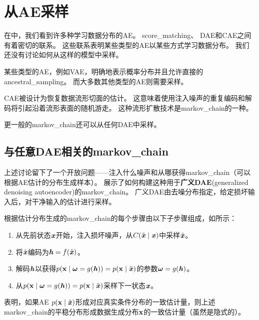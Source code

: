\section{从\gls{AE}采样}
\label{sec:drawing_samples_from_autoencoders}

在中，我们看到许多种学习数据分布的\gls{AE}。
\gls{score_matching}、 \gls{DAE}和\gls{CAE}之间有着密切的联系。
这些联系表明某些类型的\gls{AE}以某些方式学习数据分布。
我们还没有讨论如何从这样的模型中采样。

某些类型的\gls{AE}，例如\gls{VAE}，明确地表示概率分布并且允许直接的\gls{ancestral_sampling}。
而大多数其他类型的\gls{AE}则需要采样。

\gls{CAE}被设计为恢复数据流形切面的估计。
这意味着使用注入噪声的重复编码和解码将引起沿着流形表面的随机游走\citep{Rifai-icml2012-small,Mesnil-et-al-LW2012}。
这种流形扩散技术是\gls{markov_chain}的一种。

更一般的\gls{markov_chain}还可以从任何\gls{DAE}中采样。


\subsection{与任意\gls{DAE}相关的\gls{markov_chain}}
\label{sec:markov_chain_associated_with_any_denoising_autoencoder}

上述讨论留下了一个开放问题——注入什么噪声和从哪获得\gls{markov_chain}（可以根据\gls{AE}估计的分布生成样本）。
\citet{Bengio-et-al-NIPS2013-small} 展示了如何构建这种用于\textbf{广义\gls{DAE}}(generalized denoising autoencoder)的\gls{markov_chain}。
广义\gls{DAE}由去噪分布指定，给定损坏输入后，对干净输入的估计进行采样。

根据估计分布生成的\gls{markov_chain}的每个步骤由以下子步骤组成，如所示：
\begin{enumerate}
 \item 从先前状态$\boldsymbol{\mathit{x}}$开始，注入损坏噪声，从$C(\tilde{\boldsymbol{\mathit{x}}}  \mid  \boldsymbol{\mathit{x}})$中采样$\tilde{\boldsymbol{\mathit{x}}}$。
 \item 将$\tilde{\boldsymbol{\mathit{x}}}$编码为$\boldsymbol{\mathit{h}} = f(\tilde{\boldsymbol{\mathit{x}}})$。
 \item 解码$\boldsymbol{\mathit{h}}$以获得$p(\mathbf{x}  \mid  \boldsymbol{\omega} = g(\boldsymbol{\mathit{h}})) = p(\mathbf{x}  \mid  \tilde{\boldsymbol{\mathit{x}}})$的参数$\boldsymbol{\omega} = g(\boldsymbol{\mathit{h}})$。
 \item 从$p(\mathbf{x}  \mid  \boldsymbol{\omega} = g(\boldsymbol{\mathit{h}})) = p(\mathbf{x}  \mid  \tilde{\boldsymbol{\mathit{x}}})$采样下一状态$\boldsymbol{\mathit{x}}$。
\end{enumerate}
\citet{Bengio-et-al-ICML-2014}表明，如果\gls{AE} $p(\mathbf{x}  \mid  \tilde{\boldsymbol{\mathit{x}}})$形成对应真实条件分布的一致估计量，则上述\gls{markov_chain}的平稳分布形成数据生成分布$\mathbf{x}$的一致估计量（虽然是隐式的）。

